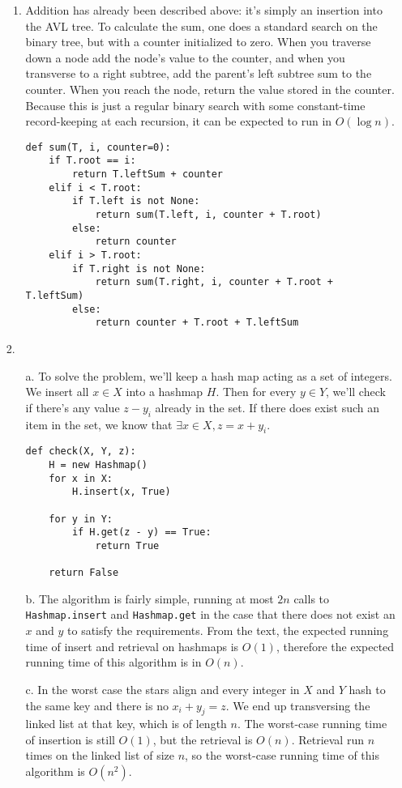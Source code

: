 \documentclass{article}
\begin{document}
\begin{enumerate}
\begin{enumerate}
    \item Addition has already been described above: it's simply an insertion into the AVL tree. To calculate the sum, one does a standard search on the binary tree, but with a counter initialized to zero. When you traverse down a node add the node's value to the counter, and when you transverse to a right subtree, add the parent's left subtree sum to the counter. When you reach the node, return the value stored in the counter. Because this is just a regular binary search with some constant-time record-keeping at each recursion, it can be expected to run in $O(\log n)$.

\begin{lstlisting}
def sum(T, i, counter=0):
    if T.root == i:
        return T.leftSum + counter
    elif i < T.root:
        if T.left is not None:
            return sum(T.left, i, counter + T.root)
        else:
            return counter
    elif i > T.root:
        if T.right is not None:
            return sum(T.right, i, counter + T.root + T.leftSum)
        else:
            return counter + T.root + T.leftSum
\end{lstlisting}
    \end{enumerate}

\item [2.]
    \begin{enumerate}
    \item [a.] To solve the problem, we'll keep a hash map acting as a set of integers. We insert all $x \in X$ into a hashmap $H$. Then for every $y \in Y$, we'll check if there's any value $z - y_i$ already in the set. If there does exist such an item in the set, we know that $\exists x \in X, z = x + y_i$.

\begin{lstlisting}
def check(X, Y, z):
    H = new Hashmap()
    for x in X:
        H.insert(x, True)

    for y in Y:
        if H.get(z - y) == True:
            return True

    return False
\end{lstlisting}


    \item [b.] The algorithm is fairly simple, running at most $2n$ calls to \texttt{Hashmap.insert} and \texttt{Hashmap.get} in the case that there does not exist an $x$ and $y$ to satisfy the requirements. From the text, the expected running time of insert and retrieval on hashmaps is $O(1)$, therefore the expected running time of this algorithm is in $O(n)$.

    \item [c.] In the worst case the stars align and every integer in $X$ and $Y$ hash to the same key and there is no $x_i + y_j = z$. We end up transversing the linked list at that key, which is of length $n$. The worst-case running time of insertion is still $O(1)$, but the retrieval is $O(n)$. Retrieval run $n$ times on the linked list of size $n$, so the worst-case running time of this algorithm is $O(n^2)$.

    \end{enumerate}
\end{enumerate}
\end{document}
